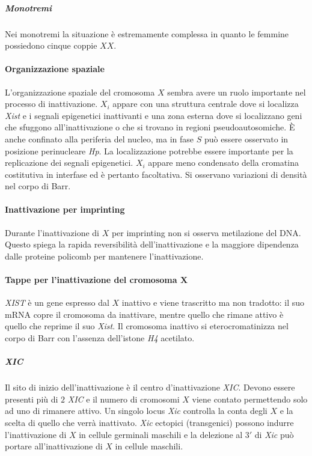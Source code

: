 				\subparagraph{Monotremi}
				Nei monotremi la situazione \`e estremamente complessa in quanto le femmine possiedono cinque coppie $XX$.

			\paragraph{Organizzazione spaziale}
			L'organizzazione spaziale del cromosoma $X$ sembra avere un ruolo importante nel processo di inattivazione.
			$X_i$ appare con una struttura centrale dove si localizza \emph{Xist} e i segnali epigenetici inattivanti e una zona esterna dove si localizzano geni che sfuggono all'inattivazione o che si trovano in regioni pseudoautosomiche.
			\`E anche confinato alla periferia del nucleo, ma in fase $S$ pu\`o essere osservato in posizione perinucleare \emph{Hp}.
			La localizzazione potrebbe essere importante per la replicazione dei segnali epigenetici.
			$X_i$ appare meno condensato della cromatina costitutiva in interfase ed \`e pertanto facoltativa.
			Si osservano variazioni di densit\`a nel corpo di Barr.

			\paragraph{Inattivazione per imprinting}
			Durante l'inattivazione di $X$ per imprinting non si osserva metilazione del DNA.
			Questo spiega la rapida reversibilit\`a dell'inattivazione e la maggiore dipendenza dalle proteine policomb per mantenere l'inattivazione.

			\paragraph{Tappe per l'inattivazione del cromosoma $\mathbf{X}$}
			\emph{XIST} \`e un gene espresso dal $X$ inattivo e viene trascritto ma non tradotto: il suo mRNA copre il cromosoma da inattivare, mentre quello che rimane attivo \`e quello che reprime il suo \emph{Xist}.
			Il cromosoma inattivo si eterocromatinizza nel corpo di Barr con l'assenza dell'istone \emph{H4} acetilato.
			
				\subparagraph{\emph{XIC}}
				Il sito di inizio dell'inattivazione \`e il centro d'inattivazione \emph{XIC}.
				Devono essere presenti pi\`u di $2$ \emph{XIC} e il numero di cromosomi $X$ viene contato permettendo solo ad uno di rimanere attivo.
				Un singolo locus \emph{Xic} controlla la conta degli $X$ e la scelta di quello che verr\`a inattivato.
				\emph{Xic} ectopici (transgenici) possono indurre l'inattivazione di $X$ in cellule germinali maschili e la delezione al $3'$ di \emph{Xic} pu\`o portare all'inattivazione di $X$ in cellule maschili.
				

